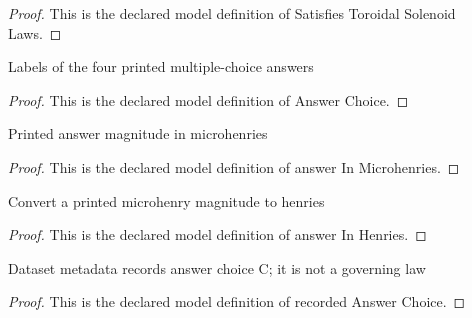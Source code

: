 \begin{proof}
  This is the declared model definition of Satisfies Toroidal Solenoid Laws.
\end{proof}
\begin{definition}
  \label{def:physics:phyx-mini-0922:phyxminiproblems-problemphyxmini0922-answerchoice}
  Labels of the four printed multiple-choice answers
\end{definition}
\begin{proof}
  This is the declared model definition of Answer Choice.
\end{proof}
\begin{definition}
  \label{def:physics:phyx-mini-0922:phyxminiproblems-problemphyxmini0922-answerinmicrohenries}
  Printed answer magnitude in microhenries
\end{definition}
\begin{proof}
  This is the declared model definition of answer In Microhenries.
\end{proof}
\begin{definition}
  \label{def:physics:phyx-mini-0922:phyxminiproblems-problemphyxmini0922-answerinhenries}
  Convert a printed microhenry magnitude to henries
\end{definition}
\begin{proof}
  This is the declared model definition of answer In Henries.
\end{proof}
\begin{definition}
  \label{def:physics:phyx-mini-0922:phyxminiproblems-problemphyxmini0922-recordedanswerchoice}
  Dataset metadata records answer choice C; it is not a governing law
\end{definition}
\begin{proof}
  This is the declared model definition of recorded Answer Choice.
\end{proof}
